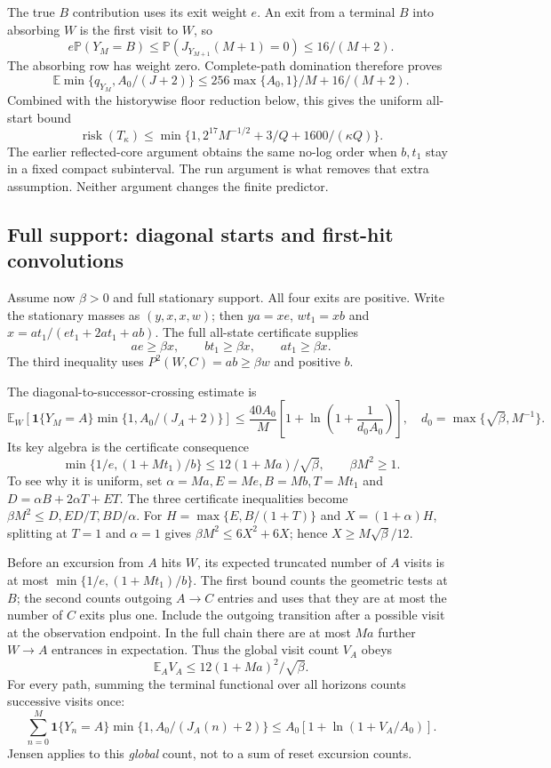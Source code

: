 \documentclass[11pt,letterpaper]{article}
\theoremstyle{definition}\newtheorem{definition}[theorem]{Definition}
\theoremstyle{remark}\newtheorem{remark}[theorem]{Remark}
\newcommand{\E}{\mathbb{E}}
\newcommand{\Prob}{\mathbb{P}}
\newcommand{\ind}{\mathbf{1}}
\begin{document}
The true $B$ contribution uses its exit weight $e$. An exit from a terminal $B$ into absorbing $W$ is the first visit to $W$, so
\[
 e\Prob(Y_M=B)
 \le\Prob(J_{Y_{M+1}}(M+1)=0)\le16/(M+2).
\]
The absorbing row has weight zero. Complete-path domination therefore proves
\[
 \E\min\{q_{Y_M},A_0/(J+2)\}
 \le256\max\{A_0,1\}/M+16/(M+2).
\]
Combined with the historywise floor reduction below, this gives the uniform all-start bound
\begin{equation}\label{eq:absorbingrisk}
 \operatorname{risk}(T_\kappa)
 \le\min\{1,2^{17}M^{-1/2}+3/Q+1600/(\kappa Q)\}.
\end{equation}
The earlier reflected-core argument obtains the same no-log order when $b,t_1$ stay in a fixed compact subinterval. The run argument is what removes that extra assumption. Neither argument changes the finite predictor.

\subsection{Full support: diagonal starts and first-hit convolutions}
Assume now $\beta>0$ and full stationary support. All four exits are positive. Write the stationary masses as $(y,x,x,w)$; then
$ya=xe$, $wt_1=xb$ and $x=at_1/(et_1+2at_1+ab)$.
The full all-state certificate supplies
\[
 ae\ge\beta x,\qquad bt_1\ge\beta x,\qquad at_1\ge\beta x.
\]
The third inequality uses $P^2(W,C)=ab\ge\beta w$ and positive $b$.

The diagonal-to-successor-crossing estimate is
\begin{equation}\label{eq:diagcross}
 \E_W\!\left[\ind\{Y_M=A\}\min\{1,A_0/(J_A+2)\}\right]
 \le\frac{40A_0}{M}
 \left[1+\ln\left(1+\frac1{d_0A_0}\right)\right],
 \quad d_0=\max\{\sqrt\beta,M^{-1}\}.
\end{equation}
Its key algebra is the certificate consequence
\[
 \min\{1/e,(1+Mt_1)/b\}
 \le12(1+Ma)/\sqrt\beta,\qquad \beta M^2\ge1.
\]
To see why it is uniform, set
$\alpha=Ma,E=Me,B=Mb,T=Mt_1$ and
$D=\alpha B+2\alpha T+ET$. The three certificate inequalities become
$\beta M^2\le D,ED/T,BD/\alpha$.
For $H=\max\{E,B/(1+T)\}$ and $X=(1+\alpha)H$, splitting at $T=1$ and $\alpha=1$ gives
$\beta M^2\le6X^2+6X$; hence $X\ge M\sqrt\beta/12$.

Before an excursion from $A$ hits $W$, its expected truncated number of $A$ visits is at most
$\min\{1/e,(1+Mt_1)/b\}$.
The first bound counts the geometric tests at $B$; the second counts outgoing $A\to C$ entries and uses that they are at most the number of $C$ exits plus one. Include the outgoing transition after a possible visit at the observation endpoint. In the full chain there are at most $Ma$ further $W\to A$ entrances in expectation. Thus the global visit count $V_A$ obeys
\[
 \E_A V_A\le12(1+Ma)^2/\sqrt\beta .
\]
For every path, summing the terminal functional over all horizons counts successive visits once:
\[
 \sum_{n=0}^M
 \ind\{Y_n=A\}\min\{1,A_0/(J_A(n)+2)\}
 \le A_0[1+\ln(1+V_A/A_0)].
\]
Jensen applies to this \emph{global} count, not to a sum of reset excursion counts.
\end{document}
